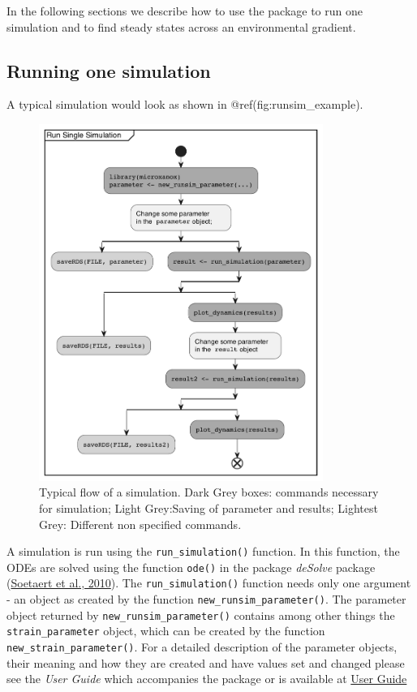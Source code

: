 \documentclass[]{elsarticle} %
\begin{document}
In the following sections we describe how to use the package to run one
simulation and to find steady states across an environmental gradient.

\hypertarget{running-one-simulation}{%
\subsection{Running one simulation}\label{running-one-simulation}}

A typical simulation would look as shown in @ref(fig:runsim\_example).

\begin{figure}

{\centering \includegraphics[width=350px]{./figures/simflow} 

}

\caption{Typical flow of a simulation. Dark Grey boxes: commands necessary for simulation; Light Grey:Saving of parameter and results; Lightest Grey: Different non specified commands.}\label{fig:runsim_example}
\end{figure}

A simulation is run using the \texttt{run\_simulation()} function. In
this function, the ODEs are solved using the function \texttt{ode()} in
the package \emph{deSolve} package
(\protect\hyperlink{ref-Soetaert2010}{Soetaert et al., 2010}). The
\texttt{run\_simulation()} function needs only one argument - an object
as created by the function \texttt{new\_runsim\_parameter()}. The
parameter object returned by \texttt{new\_runsim\_parameter()} contains
among other things the \texttt{strain\_parameter} object, which can be
created by the function \texttt{new\_strain\_parameter()}. For a
detailed description of the parameter objects, their meaning and how
they are created and have values set and changed please see the
\emph{User Guide} which accompanies the package or is available at
\href{@LINK_NEEDED}{User Guide}
\end{document}
